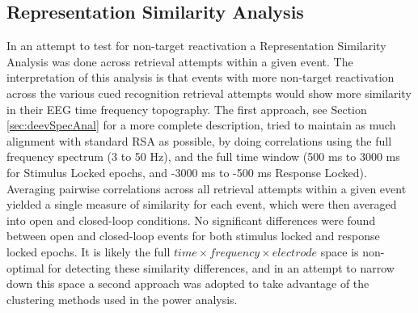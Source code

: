\documentclass[11pt, titlepage, twoside]{article}
\begin{document}
\subsection{Representation Similarity Analysis}
In an attempt to test for non-target reactivation a Representation Similarity Analysis was done across retrieval attempts within a given event.  The interpretation of this analysis is that events with more non-target reactivation across the various cued recognition retrieval attempts would show more similarity in their EEG time frequency topography.  The first approach, see Section \ref{sec:deevSpecAnal} for a more complete description, tried to maintain as much alignment with standard RSA as possible, by doing correlations using the full frequency spectrum (3 to 50 Hz), and the full time window (500 ms to 3000 ms for Stimulus Locked epochs, and -3000 ms to -500 ms Response Locked).  Averaging pairwise correlations across all retrieval attempts within a given event yielded a single measure of similarity for each event, which were then averaged into open and closed-loop conditions. No significant differences were found between open and closed-loop events for both stimulus locked and response locked epochs.  It is likely the full $time \times frequency \times electrode$ space is non-optimal for detecting these similarity differences, and in an attempt to narrow down this space a second approach was adopted to take advantage of the clustering methods used in the power analysis.
\end{document}
